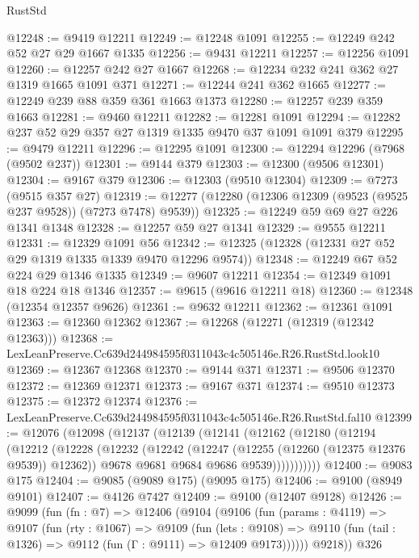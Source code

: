 \begin{lexlean}{RustStd}
\begin{coremodule}
@12248 := @9419 @12211
@12249 := @12248 @1091
@12255 := @12249 @242 @52 @27 @29 @1667 @1335
@12256 := @9431 @12211
@12257 := @12256 @1091
@12260 := @12257 @242 @27 @1667
@12268 := @12234 @232 @241 @362 @27 @1319 @1665 @1091 @371
@12271 := @12244 @241 @362 @1665
@12277 := @12249 @239 @88 @359 @361 @1663 @1373
@12280 := @12257 @239 @359 @1663
@12281 := @9460 @12211
@12282 := @12281 @1091
@12294 := @12282 @237 @52 @29 @357 @27 @1319 @1335 @9470 @37 @1091 @1091 @379
@12295 := @9479 @12211
@12296 := @12295 @1091
@12300 := @12294 @12296 (@7968 (@9502 @237))
@12301 := @9144 @379
@12303 := @12300 (@9506 @12301)
@12304 := @9167 @379
@12306 := @12303 (@9510 @12304)
@12309 := @7273 (@9515 @357 @27)
@12319 := @12277 (@12280 (@12306 @12309 (@9523 (@9525 @237 @9528)) (@7273 @7478) @9539))
@12325 := @12249 @59 @69 @27 @226 @1341 @1348
@12328 := @12257 @59 @27 @1341
@12329 := @9555 @12211
@12331 := @12329 @1091 @56
@12342 := @12325 (@12328 (@12331 @27 @52 @29 @1319 @1335 @1339 @9470 @12296 @9574))
@12348 := @12249 @67 @52 @224 @29 @1346 @1335
@12349 := @9607 @12211
@12354 := @12349 @1091 @18 @224 @18 @1346
@12357 := @9615 (@9616 @12211 @18)
@12360 := @12348 (@12354 @12357 @9626)
@12361 := @9632 @12211
@12362 := @12361 @1091
@12363 := @12360 @12362
@12367 := @12268 (@12271 (@12319 (@12342 @12363)))
@12368 := LexLeanPreserve.Cc639d244984595f0311043c4c505146e.R26.RustStd.look10
@12369 := @12367 @12368
@12370 := @9144 @371
@12371 := @9506 @12370
@12372 := @12369 @12371
@12373 := @9167 @371
@12374 := @9510 @12373
@12375 := @12372 @12374
@12376 := LexLeanPreserve.Cc639d244984595f0311043c4c505146e.R26.RustStd.fal10
@12399 := @12076
    (@12098
      (@12137
        (@12139
          (@12141
            (@12162
              (@12180
                (@12194
                  (@12212
                    (@12228
                      (@12232
                        (@12242
                          (@12247 (@12255 (@12260 (@12375 @12376 @9539)) @12362))
                          @9678
                          @9681
                          @9684
                          @9686
                          @9539)))))))))))
@12400 := @9083 @175
@12404 := @9085 (@9089 @175) (@9095 @175)
@12406 := @9100 (@8949 @9101)
@12407 := @4126 @7427
@12409 := @9100 (@12407 @9128)
@12426 := @9099
    (fun (fn : @7) =>
    @12406
      (@9104
        (@9106
          (fun (params : @4119) =>
          @9107
            (fun (rty : @1067) =>
            @9109
              (fun (lets : @9108) =>
              @9110 (fun (tail : @1326) => @9112 (fun (Γ : @9111) => @12409 @9173))))))
        @9218))
    @326

\end{coremodule}
\end{lexlean}
